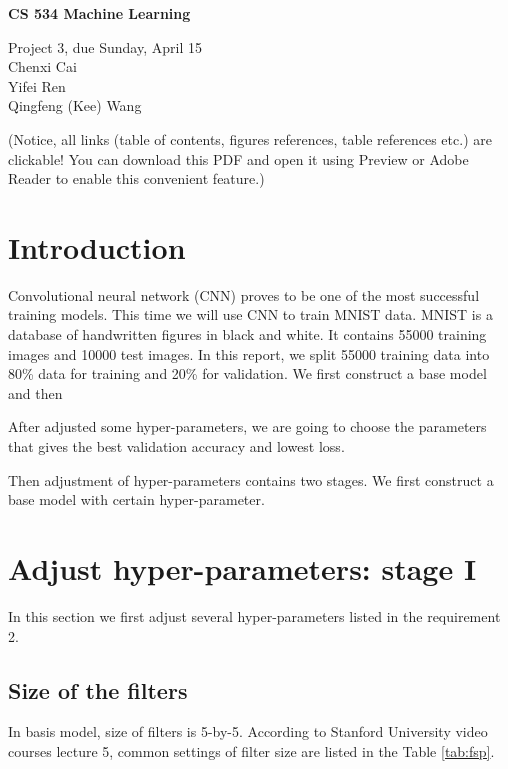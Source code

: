 \documentclass[11pt]{article}
\begin{document}
\begin{center}
  {\bf
  CS 534 Machine Learning  }

\vspace{12pt}

  Project 3, due Sunday, April 15
  \\
  Chenxi Cai \\
  Yifei Ren \\
  Qingfeng (Kee) Wang
 
\end{center}

\vspace{12pt}




\clearpage
(Notice, all links (table of contents, figures references, table references etc.) are clickable! You can download this PDF and open it using Preview or Adobe Reader to enable this convenient feature.)
 
\tableofcontents{}

\clearpage


\section{Introduction}
Convolutional neural network (CNN) proves to be one of the most successful training models. This time we will use CNN to train MNIST data. MNIST is a database of handwritten figures in black and white. It contains 55000 training images and 10000 test images. In this report, we split 55000 training data into 80\% data for training and 20\% for validation. We first construct a base model and then 

After adjusted some hyper-parameters, we are going to choose the parameters that gives the best validation accuracy and lowest loss. 

Then adjustment of hyper-parameters contains two stages. We first construct a base model with certain hyper-parameter.



\section{Adjust hyper-parameters: stage I}
In this section we first adjust several hyper-parameters listed in the requirement 2.


\subsection{Size of the filters}
In basis model, size of filters is 5-by-5. According to Stanford University video courses lecture 5, common settings of filter size are listed in the Table \ref{tab:fsp}.
\end{document}
